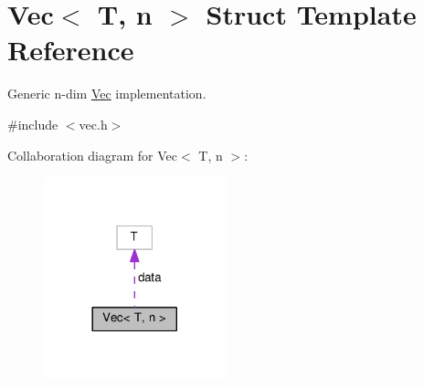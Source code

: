 \hypertarget{structVec}{}\section{Vec$<$ T, n $>$ Struct Template Reference}
\label{structVec}


Generic n-\/dim \hyperlink{structVec}{Vec} implementation.  




{\ttfamily \#include $<$vec.\+h$>$}



Collaboration diagram for Vec$<$ T, n $>$\+:\nopagebreak
\begin{figure}[H]
\begin{center}
\leavevmode
\includegraphics[width=149pt]{structVec__coll__graph}
\end{center}
\end{figure}
